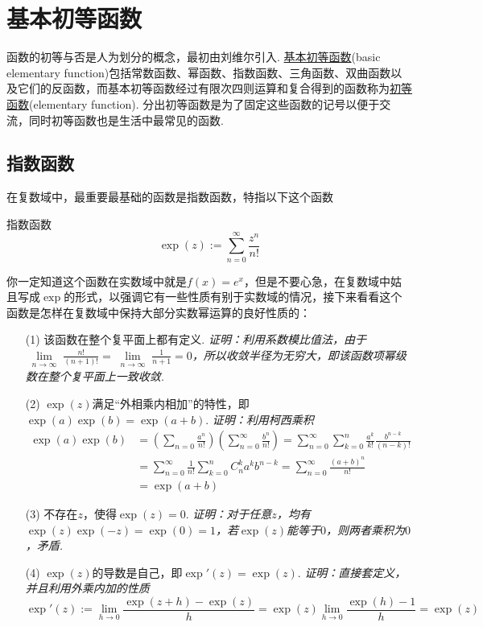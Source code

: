 \documentclass[main.tex]{subfiles}
\begin{document}
\section{基本初等函数}

函数的初等与否是人为划分的概念，最初由刘维尔引入. \uline{基本初等函数}(basic elementary function)包括常数函数、幂函数、指数函数、三角函数、双曲函数以及它们的反函数，而基本初等函数经过有限次四则运算和复合得到的函数称为\uline{初等函数}(elementary function). 分出初等函数是为了固定这些函数的记号以便于交流，同时初等函数也是生活中最常见的函数. 

\subsection{指数函数}

在复数域中，最重要最基础的函数是指数函数，特指以下这个函数
\begin{definition}{指数函数}
    \[\exp(z) := \sum_{n=0}^{\infty}\frac{z^n}{n!}\]
\end{definition}
你一定知道这个函数在实数域中就是\(f(x)=e^x\)，但是不要心急，在复数域中姑且写成\(\exp\)的形式，以强调它有一些性质有别于实数域的情况，接下来看看这个函数是怎样在复数域中保持大部分实数幂运算的良好性质的：
\begin{itemize}
    \item [(1)] 该函数在整个复平面上都有定义. 
    \newline
    \textit{
        证明：利用系数模比值法，由于\(\displaystyle{\lim \limits_{\substack{n \to \infty}} \frac{n!}{(n+1)!} = \lim \limits_{\substack{n \to \infty}} \frac{1}{n+1} = 0}\)，所以收敛半径为无穷大，即该函数项幂级数在整个复平面上一致收敛.
    }
    \item [(2)] \(\exp(z)\)满足“外相乘内相加”的特性，即\(\exp(a)\exp(b)=\exp(a+b)\).
    \newline
    \textit{
        证明：利用柯西乘积
    }
    \begin{align*}
        \exp(a)\exp(b) &= \left(\sum_{n=0}\frac{a^n}{n!}\right)\left(\sum_{n=0}^{\infty}\frac{b^n}{n!}\right) = \sum_{n=0}^{\infty}\sum_{k=0}^{n}\frac{a^k}{k!}\frac{b^{n-k}}{(n-k)!} \\
        &= \sum_{n=0}^{\infty}\frac{1}{n!}\sum_{k=0}^{n}C_n^ka^kb^{n-k} = \sum_{n=0}^{\infty}\frac{(a+b)^n}{n!} \\
        &= \exp(a+b)
    \end{align*}

    \item [(3)] 不存在\(z\)，使得\(\exp(z)=0\).
    \newline
    \textit{
        证明：对于任意\(z\)，均有\(\exp(z)\exp(-z)=\exp(0)=1\)，若\(\exp(z)\)能等于\(0\)，则两者乘积为\(0\)，矛盾.
    }
    \item [(4)] \(\exp(z)\)的导数是自己，即\(\exp'(z)=\exp(z)\).
    \newline
    \textit{
        证明：直接套定义，并且利用外乘内加的性质
        \[\exp'(z) := \lim_{h \to 0}\frac{\exp(z+h)-\exp(z)}{h} = \exp(z)\lim_{h \to 0}\frac{\exp(h)-1}{h} = \exp(z)\]
    }
\end{itemize}
\end{document}
